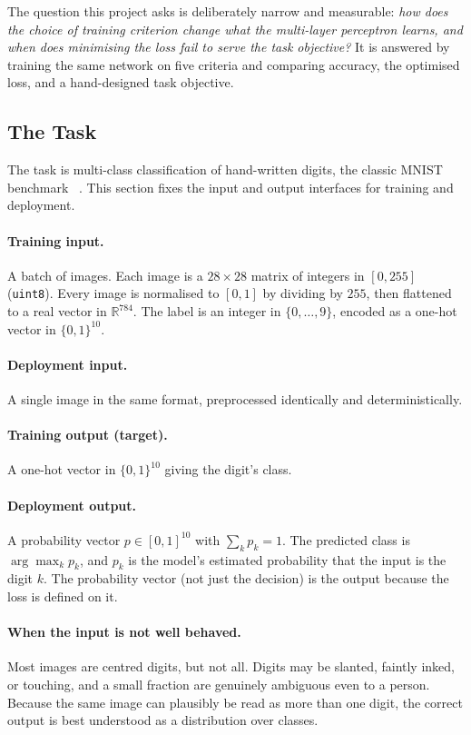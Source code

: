 \documentclass[11pt]{article}
\begin{document}
The question this project asks is deliberately narrow and measurable: \emph{how does the choice
of training criterion change what the multi-layer perceptron learns, and when does minimising
the loss fail to serve the task objective?} It is answered by training the same network on five
criteria and comparing accuracy, the optimised loss, and a hand-designed task objective.

\subsection{The Task}

The task is multi-class classification of hand-written digits, the classic MNIST benchmark
~\parencite{lecun1998}. This section fixes the input and output interfaces for training and
deployment.

\paragraph{Training input.}
A batch of images. Each image is a $28\times 28$ matrix of integers in $[0,255]$
(\texttt{uint8}). Every image is normalised to $[0,1]$ by dividing by $255$, then flattened to
a real vector in $\mathbb{R}^{784}$. The label is an integer in $\{0,\dots,9\}$, encoded as a
one-hot vector in $\{0,1\}^{10}$.

\paragraph{Deployment input.}
A single image in the same format, preprocessed identically and deterministically.

\paragraph{Training output (target).}
A one-hot vector in $\{0,1\}^{10}$ giving the digit's class.

\paragraph{Deployment output.}
A probability vector $p\in[0,1]^{10}$ with $\sum_k p_k = 1$. The predicted class is
$\arg\max_k p_k$, and $p_k$ is the model's estimated probability that the input is the digit
$k$. The probability vector (not just the decision) is the output because the loss is defined
on it.

\paragraph{When the input is not well behaved.}
Most images are centred digits, but not all. Digits may be slanted, faintly inked, or touching,
and a small fraction are genuinely ambiguous even to a person. Because the same image can
plausibly be read as more than one digit, the correct output is best understood as a
distribution over classes.
\end{document}
